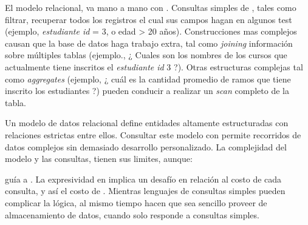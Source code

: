 El modelo relacional, va mano a mano con \sql. Consultas simples de \sql, tales como filtrar, recuperar todos los registros el cual sus campos hagan \match en algunos test (ejemplo, \textit{estudiante id} = 3, o edad > 20 años). Construcciones mas complejos causan que la base de datos haga trabajo extra, tal como \textit{joining} información sobre múltiples tablas (ejemplo., ¿ Cuales son los nombres de los cursos que actualmente tiene inscritos el \textit{estudiante id} 3 ?). Otras estructuras complejas tal como \textit{aggregates} (ejemplo, ¿ cuál es la cantidad promedio de ramos que tiene inscrito los estudiantes
?) pueden conducir a realizar un \textit{scan} completo de la tabla.


Un modelo de datos relacional define entidades altamente estructuradas con relaciones estrictas entre ellos. Consultar este modelo con \sql permite recorridos de datos complejos sin demasiado desarrollo personalizado. La complejidad del modelo y las consultas, tienen sus limites, aunque:


\complexity guía a \unpredictability. La expresividad en  implica un desafío en relación al costo de cada consulta, y así el costo de \workload. Mientras lenguajes de consultas simples pueden complicar la lógica, al mismo tiempo hacen que sea sencillo proveer de almacenamiento de datos, cuando solo responde a consultas simples.

